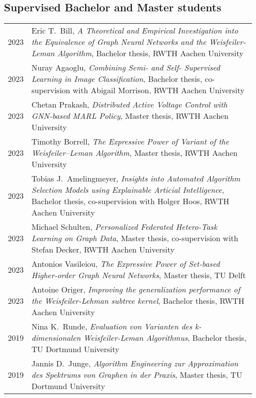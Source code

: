 \documentclass[11pt, a4paper, DIV=14, headings=small]{scrartcl}
\begin{document}
	\subsection*{Supervised Bachelor and Master students}
	\begin{longtabu}{p{2.1cm}p{12.0cm}}
		2023 & Eric T.\ Bill, \emph{A Theoretical and Empirical Investigation into the Equivalence of Graph Neural Networks and the Weisfeiler-Leman Algorithm}, Bachelor thesis, RWTH Aachen University\\    
		2023 & Nuray Agaoglu, \emph{Combining Semi- and Self- Supervised Learning in Image Classification}, Bachelor thesis, co-supervision with Abigail Morrison, RWTH Aachen University\\    
		2023 & Chetan Prakash, \emph{Distributed Active Voltage Control with GNN-based MARL Policy}, Master thesis, RWTH Aachen University\\  
		2023 & Timothy Borrell, \emph{The Expressive Power of Variant of the Weisfeiler--Leman Algorithm}, Master thesis, RWTH Aachen University\\
		2023 & Tobias J.\ Amelingmeyer, \emph{Insights into Automated Algorithm Selection Models using Explainable Articial Intelligence}, Bachelor thesis, co-supervision with Holger Hoos, RWTH Aachen University \\
		2023 & Michael Schulten, \emph{Personalized Federated Hetero-Task Learning on Graph Data}, Master thesis, co-supervision with Stefan Decker, RWTH Aachen University                                         \\
		2023 & Antonios Vasileiou, \emph{The Expressive Power of Set-based Higher-order Graph Neural Networks}, Master thesis, TU Delft                                                                             \\
		2023 & Antoine Origer, \emph{Improving the generalization performance of the Weisfeiler-Lehman subtree kernel}, Bachelor thesis, RWTH Aachen University                                                     \\
		2019 & Nina K.\ Runde, \emph{Evaluation von Varianten des k-dimensionalen Weisfeiler-Leman Algorithmus}, Bachelor thesis, TU Dortmund University                                                            \\
		2019 & Jannis D.\ Junge, \emph{Algorithm Engineering zur Approximation des Spektrums von Graphen in der Praxis}, Master thesis, TU Dortmund University                                                      \\

\end{longtabu}
\end{document}
